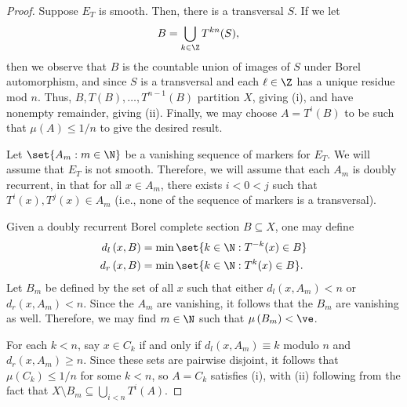 \documentclass[10pt]{mypackage}
\begin{document}
\begin{proof}
Suppose $E_T$ is smooth. Then, there is a transversal $S$. If we let
  \begin{align*}
    B &= \bigcup_{k\in \Z} T^{kn}(S),
  \end{align*}
  then we observe that $B$ is the countable union of images of $S$ under Borel automorphism, and since $S$ is a transversal and each $\ell\in \Z$ has a unique residue mod $n$. Thus, $B,T(B),\dots,T^{n-1}(B)$ partition $X$, giving (i), and have nonempty remainder, giving (ii). Finally, we may choose $A = T^{i}(B)$ to be such that $\mu(A) \leq 1/n$ to give the desired result.

  Let $\set{A_m : m\in \N}$ be a vanishing sequence of markers for $E_T$. We will assume that $E_T$ is not smooth. Therefore, we will assume that each $A_m$ is doubly recurrent, in that for all $x\in A_m$, there exists $i < 0 < j$ such that $T^{i}(x),T^{j}(x)\in A_m$ (i.e., none of the sequence of markers is a transversal).

  Given a doubly recurrent Borel complete section $B\subseteq X$, one may define
  \begin{align*}
    d_{l}\left( x,B \right) &= \min\set{k\in \N : T^{-k}(x)\in B}\\
    d_{r}\left( x,B \right) &= \min\set{k\in \N : T^{k}(x)\in B}.
  \end{align*}
  Let $B_m$ be defined by the set of all $x$ such that either $d_l\left( x,A_m \right) < n$ or $d_r\left( x,A_m \right) < n$. Since the $A_m$ are vanishing, it follows that the $B_m$ are vanishing as well. Therefore, we may find $m\in \N$ such that $\mu\left( B_m  \right) < \ve$.

  For each $k < n$, say $x\in C_k$ if and only if $d_{l}\left( x,A_m \right)\equiv k$ modulo $n$ and $d_r\left( x,A_m \right) \geq n$. Since these sets are pairwise disjoint, it follows that $\mu\left( C_k \right) \leq 1/n$ for some $k < n$, so $A = C_k$ satisfies (i), with (ii) following from the fact that $X\setminus B_m \subseteq \bigcup_{i < n}T^{i}(A)$.
\end{proof}

\nocite{topics_in_orbit_equivalence,classical_descriptive_set_theory,kerr_and_li}
\printbibliography
\end{document}
